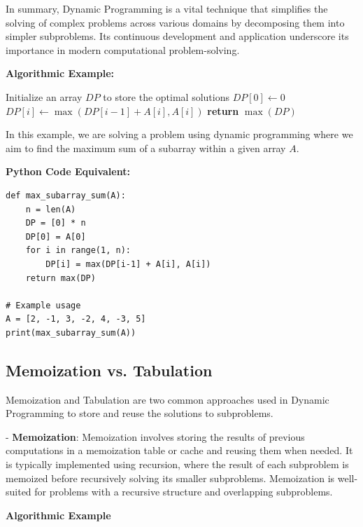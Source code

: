 \documentclass[12pt]{book} %
\begin{document}
In summary, Dynamic Programming is a vital technique that simplifies the solving of complex problems across various domains by decomposing them into simpler subproblems. Its continuous development and application underscore its importance in modern computational problem-solving.


\textbf{Algorithmic Example:}
\FloatBarrier
\begin{algorithm}
\caption{Dynamic Programming Algorithm Example}
\begin{algorithmic}[1]
\State Initialize an array $DP$ to store the optimal solutions
\State $DP[0] \gets 0$
    \State $DP[i] \gets \max(DP[i-1] + A[i], A[i])$
\EndFor
\State \textbf{return} $\max(DP)$
\end{algorithmic}
\end{algorithm}
\FloatBarrier
In this example, we are solving a problem using dynamic programming where we aim to find the maximum sum of a subarray within a given array $A$.

\textbf{Python Code Equivalent:}
\FloatBarrier
\begin{lstlisting}
def max_subarray_sum(A):
    n = len(A)
    DP = [0] * n
    DP[0] = A[0]
    for i in range(1, n):
        DP[i] = max(DP[i-1] + A[i], A[i])
    return max(DP)

# Example usage
A = [2, -1, 3, -2, 4, -3, 5]
print(max_subarray_sum(A))
\end{lstlisting}

\subsection{Memoization vs. Tabulation}

Memoization and Tabulation are two common approaches used in Dynamic Programming to store and reuse the solutions to subproblems. 

- \textbf{Memoization}: Memoization involves storing the results of previous computations in a memoization table or cache and reusing them when needed. It is typically implemented using recursion, where the result of each subproblem is memoized before recursively solving its smaller subproblems. Memoization is well-suited for problems with a recursive structure and overlapping subproblems.

\textbf{Algorithmic Example}
\end{document}
